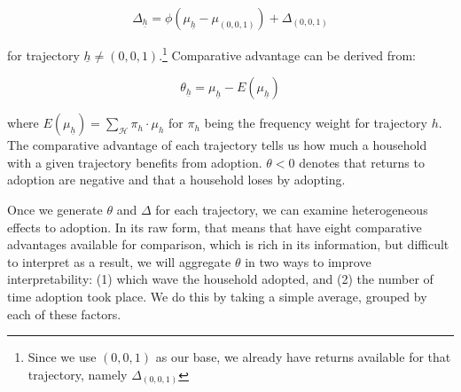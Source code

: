 \documentclass{article}
\begin{document}
$$
\Delta_{\underline{h}}=\phi\left(\mu_{\underline{h}}-\mu_{(0,0,1)}\right) + \Delta_{(0,0,1)}
$$

for trajectory $\underline{h} \neq (0,0,1)$.\footnote{Since we use $(0,0,1)$ as our base, we already have returns available for that trajectory, namely $\Delta_{(0,0,1)}$} Comparative advantage can be derived from:

$$
\theta_{\underline{h}} = \mu_{\underline{h}} - E(\mu_{\underline{h}})
$$

where $E(\mu_{\underline{h}}) = \sum_{\mathcal{H}} \pi_h \cdot \mu_h$ for $\pi_h$ being the frequency weight for trajectory $h$. The comparative advantage of each trajectory tells us how much a household with a given trajectory benefits from adoption. $\theta <0 $ denotes that returns to adoption are negative and that a household loses by adopting.

Once we generate $\theta$ and $\Delta$ for each trajectory, we can examine heterogeneous effects to adoption. In its raw form, that means that have eight comparative advantages available for comparison, which is rich in its information, but difficult to interpret as a result, we will aggregate $\theta$ in two ways to improve interpretability: (1) which wave the household adopted, and (2) the number of time adoption took place. We do this by taking a simple average, grouped by each of these factors.
\end{document}
